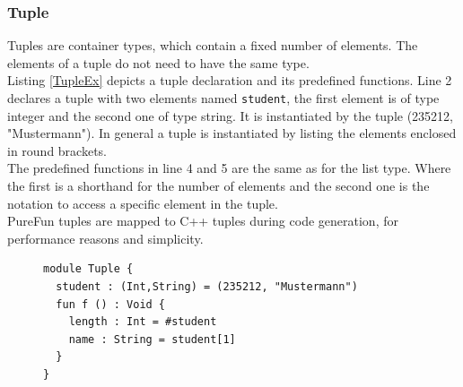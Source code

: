 \subsubsection{Tuple}
Tuples are container types, which contain a fixed number of elements. The elements of a tuple do not need to have the same type.\\
Listing \ref{TupleEx} depicts a tuple declaration and its predefined functions. Line 2 declares a tuple with two elements named \texttt{student}, the first element is of type integer and the second one of type string. It is instantiated by the tuple (235212, "Mustermann"). In general a tuple is instantiated by listing the elements enclosed in round brackets.\\
The predefined functions in line 4 and 5 are the same as for the list type. Where the first is a shorthand for the number of elements and the second one is the notation to access a specific element in the tuple.\\
PureFun tuples are mapped to C++ tuples during code generation, for performance reasons and simplicity.
\begin{figure}
\begin{lstlisting}[caption={PureFun code with a tuple and its predefined functions.},label={TupleEx}]
module Tuple {
  student : (Int,String) = (235212, "Mustermann")
  fun f () : Void {
    length : Int = #student
    name : String = student[1]
  }
}
\end{lstlisting}
\end{figure}
